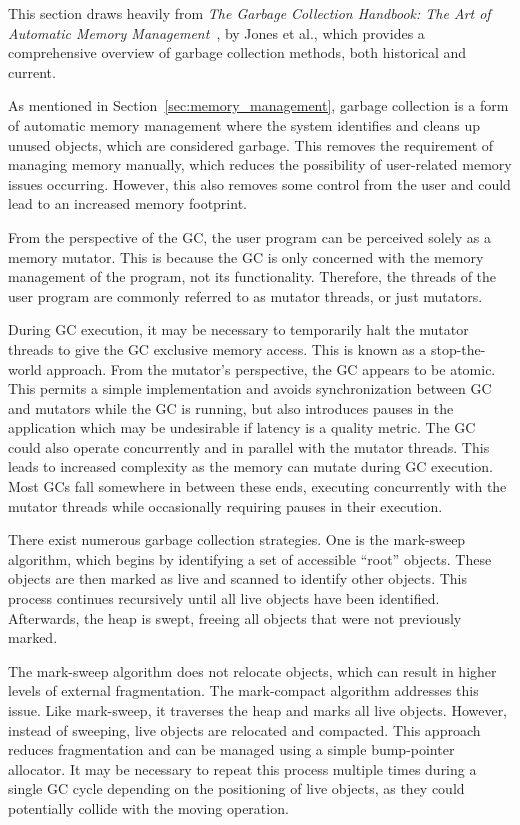 
This section draws heavily from \textit{The Garbage Collection Handbook: The Art of Automatic Memory Management}~\cite{gchandbook}, by Jones et al., which provides a comprehensive overview of garbage collection methods, both historical and current.

As mentioned in Section~\ref{sec:memory_management}, garbage collection is a form of automatic memory management where the system identifies and cleans up unused objects, which are considered garbage. This removes the requirement of managing memory manually, which reduces the possibility of user-related memory issues occurring. However, this also removes some control from the user and could lead to an increased memory footprint.

From the perspective of the GC, the user program can be perceived solely as a memory mutator. This is because the GC is only concerned with the memory management of the program, not its functionality. Therefore, the threads of the user program are commonly referred to as mutator threads, or just mutators.

During GC execution, it may be necessary to temporarily halt the mutator threads to give the GC exclusive memory access. This is known as a stop-the-world approach. From the mutator's perspective, the GC appears to be atomic. This permits a simple implementation and avoids synchronization between GC and mutators while the GC is running, but also introduces pauses in the application which may be undesirable if latency is a quality metric. The GC could also operate concurrently and in parallel with the mutator threads. This leads to increased complexity as the memory can mutate during GC execution. Most GCs fall somewhere in between these ends, executing concurrently with the mutator threads while occasionally requiring pauses in their execution.

There exist numerous garbage collection strategies. One is the mark-sweep algorithm, which begins by identifying a set of accessible ``root'' objects. These objects are then marked as live and scanned to identify other objects. This process continues recursively until all live objects have been identified. Afterwards, the heap is swept, freeing all objects that were not previously marked.

The mark-sweep algorithm does not relocate objects, which can result in higher levels of external fragmentation. The mark-compact algorithm addresses this issue. Like mark-sweep, it traverses the heap and marks all live objects. However, instead of sweeping, live objects are relocated and compacted. This approach reduces fragmentation and can be managed using a simple bump-pointer allocator. It may be necessary to repeat this process multiple times during a single GC cycle depending on the positioning of live objects, as they could potentially collide with the moving operation.

